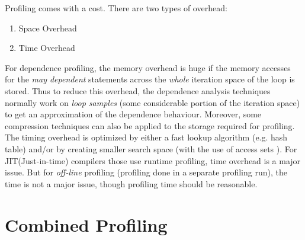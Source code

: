 \documentclass[10pt]{report}          %
\begin{document}
Profiling comes with a cost.  There are two types of overhead:
\begin{enumerate}
\item Space Overhead
\item Time Overhead
\end{enumerate}
For dependence profiling, the memory overhead is huge if the memory accesses for the \textit{may dependent} statements across the \textit{whole} iteration space of the loop is stored.  Thus to reduce this overhead, the dependence analysis techniques normally work on \textit{loop samples} (some considerable portion of the iteration space) to get an approximation of the dependence behaviour.  Moreover, some compression techniques can also be applied to the storage required for profiling.\\
The timing overhead is optimized by either a fast lookup algorithm (e.g. hash table) and/or by creating smaller search space (with the use of access sets \cite{sd}).  For JIT(Just-in-time) compilers those use runtime profiling, time overhead is a major issue.  But for \textit{off-line} profiling (profiling done in a separate profiling run), the time is not a major issue, though profiling time should be reasonable.

\section{Combined Profiling}
\end{document}
